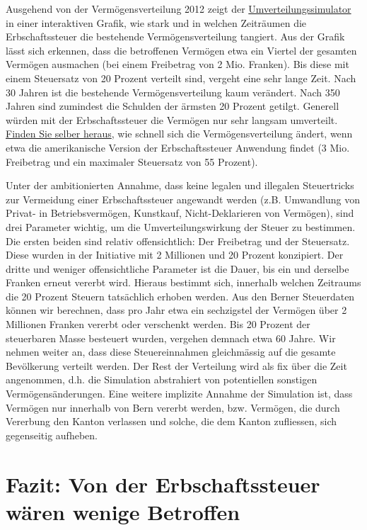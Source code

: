 \documentclass[a4paper, 12pt,liststotoc]{scrartcl}
\numberwithin{equation}{section}
\begin{document}
Ausgehend von der Vermögensverteilung 2012 zeigt der
\href{https://inequalities.shinyapps.io/simulation/}{Umverteilungssimulator}
in einer interaktiven Grafik, wie stark und in welchen Zeiträumen die
Erbschaftssteuer die bestehende Vermögensverteilung tangiert. Aus der
Grafik lässt sich erkennen, dass die betroffenen Vermögen etwa ein
Viertel der gesamten Vermögen ausmachen (bei einem Freibetrag von 2 Mio.
Franken). Bis diese mit einem Steuersatz von 20 Prozent verteilt sind,
vergeht eine sehr lange Zeit. Nach 30 Jahren ist die bestehende
Vermögensverteilung kaum verändert. Nach 350 Jahren sind zumindest die
Schulden der ärmsten 20 Prozent getilgt. Generell würden mit der
Erbschaftssteuer die Vermögen nur sehr langsam umverteilt. \href{https://inequalities.shinyapps.io/simulation/}{Finden Sie
selber heraus}, wie schnell sich die Vermögensverteilung ändert, wenn
etwa die amerikanische Version der Erbschaftssteuer Anwendung findet (3
Mio. Freibetrag und ein maximaler Steuersatz von 55 Prozent).

Unter der ambitionierten Annahme, dass keine legalen und illegalen Steuertricks zur Vermeidung einer Erbschaftssteuer angewandt werden (z.B. Umwandlung von Privat- in Betriebsvermögen, Kunstkauf, Nicht-Deklarieren von Vermögen), sind drei Parameter wichtig, um die Umverteilungswirkung der Steuer zu bestimmen. Die ersten beiden sind relativ offensichtlich: Der Freibetrag und der Steuersatz. Diese wurden in der Initiative mit 2 Millionen und 20 Prozent konzipiert. Der dritte und weniger offensichtliche Parameter ist die Dauer, bis ein und derselbe Franken erneut vererbt wird. Hieraus bestimmt sich, innerhalb welchen Zeitraums die 20 Prozent Steuern tatsächlich erhoben werden. Aus den Berner Steuerdaten können wir berechnen, dass pro Jahr etwa ein sechzigstel der Vermögen über 2 Millionen Franken vererbt oder verschenkt werden. Bis 20 Prozent der steuerbaren Masse besteuert wurden, vergehen demnach etwa 60 Jahre.  Wir nehmen weiter an, dass diese Steuereinnahmen gleichmässig auf die gesamte Bevölkerung verteilt werden. Der Rest der Verteilung wird als fix über die Zeit angenommen, d.h. die Simulation abstrahiert von potentiellen sonstigen Vermögensänderungen. Eine weitere implizite Annahme der Simulation ist, dass Vermögen nur innerhalb von Bern vererbt werden, bzw. Vermögen, die durch Vererbung den Kanton verlassen und solche, die dem Kanton zufliessen, sich gegenseitig aufheben.

\section{Fazit: Von der Erbschaftssteuer wären wenige
Betroffen}\label{fazit-von-der-erbschaftssteuer-wuxe4ren-wenige-betroffen}
\end{document}
